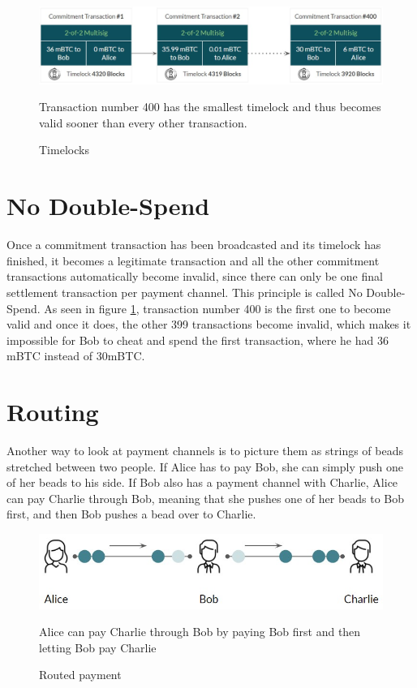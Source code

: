 \documentclass[a4paper, 12pt]{report}
\begin{document}
\begin{figure}[h]
	\centering
	\includegraphics[width=13cm]{06_Timelocks}
	\caption{Timelocks}
	\medskip
	\small Transaction number 400 has the smallest timelock and thus becomes valid sooner than every other transaction.
	\label{fig:06_Timelocks}
\end{figure}

\section{No Double-Spend}
\par Once a commitment transaction has been broadcasted and its timelock has finished, it becomes a legitimate transaction and all the other commitment transactions automatically become invalid, since there can only be one final settlement transaction per payment channel. This principle is called No Double-Spend.  As seen in figure \ref{fig:06_Timelocks}, transaction number 400 is the first one to become valid and once it does, the other 399 transactions become invalid, which makes it impossible for Bob to cheat and spend the first transaction, where he had 36 mBTC instead of 30mBTC.

\section{Routing}
\par Another way to look at payment channels is to picture them as strings of beads stretched between two people. If Alice has to pay Bob, she can simply push one of her beads to his side. If Bob also has a payment channel with Charlie, Alice can pay Charlie through Bob, meaning that she pushes one of her beads to Bob first, and then Bob pushes a bead over to Charlie.

\begin{figure}[H]
	\centering
	\includegraphics[width=12cm]{07_Beads}
	\caption{Routed payment}
	\medskip
	\small Alice can pay Charlie through Bob by paying Bob first and then letting Bob pay Charlie
	\label{fig:07_Beads}
\end{figure}
\end{document}

